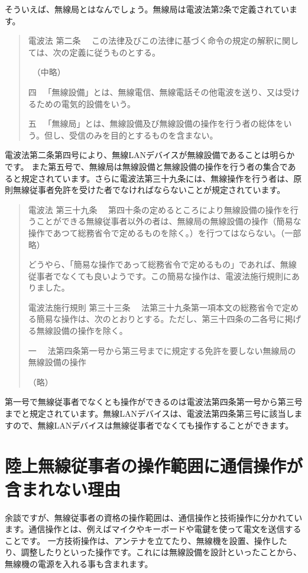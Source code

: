 そういえば、無線局とはなんでしょう。無線局は電波法第2条で定義されています。
\begin{quotation}
    電波法 第二条 　この法律及びこの法律に基づく命令の規定の解釈に関しては、次の定義に従うものとする。

    　（中略）

    四 　「無線設備」とは、無線電信、無線電話その他電波を送り、又は受けるための電気的設備をいう。

    五 　「無線局」とは、無線設備及び無線設備の操作を行う者の総体をいう。但し、受信のみを目的とするものを含まない。
\end{quotation}
電波法第二条第四号により、無線LANデバイスが無線設備であることは明らかです。 また第五号で、無線局は無線設備と無線設備の操作を行う者の集合であると規定されています。さらに電波法第三十九条には、無線操作を行う者は、原則無線従事者免許を受けた者でなければならないことが規定されています。
\begin{quotation}
    電波法 第三十九条 　第四十条の定めるところにより無線設備の操作を行うことができる無線従事者以外の者は、無線局の無線設備の操作（簡易な操作であつて総務省令で定めるものを除く。）を行つてはならない。（一部略）

どうやら、「簡易な操作であって総務省令で定めるもの」であれば、無線従事者でなくても良いようです。この簡易な操作は、電波法施行規則にありました。

    電波法施行規則 第三十三条 　法第三十九条第一項本文の総務省令で定める簡易な操作は、次のとおりとする。ただし、第三十四条の二各号に掲げる無線設備の操作を除く。

    一 　法第四条第一号から第三号までに規定する免許を要しない無線局の無線設備の操作

    （略）
\end{quotation}

第一号で無線従事者でなくとも操作ができるのは電波法第四条第一号から第三号までと規定されています。無線LANデバイスは、電波法第四条第三号に該当しますので、無線LANデバイスは無線従事者でなくても操作することができます。

\section*{陸上無線従事者の操作範囲に通信操作が含まれない理由}
余談ですが、無線従事者の資格の操作範囲は、通信操作と技術操作に分かれています。通信操作とは、例えばマイクやキーボードや電鍵を使って電文を送信することです。
一方技術操作は、アンテナを立てたり、無線機を設置、操作したり、調整したりといった操作です。これには無線設備を設計といったことから、無線機の電源を入れる事も含まれます。

